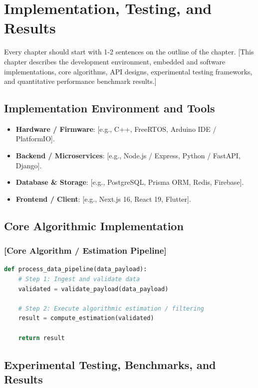 \chapter{Implementation, Testing, and Results}

Every chapter should start with 1-2 sentences on the outline of the chapter. [This chapter describes the development environment, embedded and software implementations, core algorithms, API designs, experimental testing frameworks, and quantitative performance benchmark results.]

\section{Implementation Environment and Tools}
\begin{itemize}
    \item \textbf{Hardware / Firmware}: [e.g., C++, FreeRTOS, Arduino IDE / PlatformIO].
    \item \textbf{Backend / Microservices}: [e.g., Node.js / Express, Python / FastAPI, Django].
    \item \textbf{Database \& Storage}: [e.g., PostgreSQL, Prisma ORM, Redis, Firebase].
    \item \textbf{Frontend / Client}: [e.g., Next.js 16, React 19, Flutter].
\end{itemize}

\section{Core Algorithmic Implementation}
\subsection{[Core Algorithm / Estimation Pipeline]}
\begin{lstlisting}[language=Python, caption={[Sample Core Algorithm Implementation Snippet]}]
def process_data_pipeline(data_payload):
    # Step 1: Ingest and validate data
    validated = validate_payload(data_payload)
    
    # Step 2: Execute algorithmic estimation / filtering
    result = compute_estimation(validated)
    
    return result
\end{lstlisting}

\section{Experimental Testing, Benchmarks, and Results}
